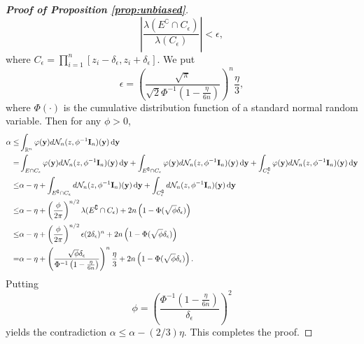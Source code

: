 \documentclass[11pt]{article}
\newcommand{\By}{\mathbf{y}}    \newcommand{\Bz}{\mathbf{z}}
\theoremstyle{plain}
\theoremstyle{definition}
\theoremstyle{remark}
\begin{document}
\begin{appendices}
\begin{proof}[\textbf{Proof of Proposition \ref{prop:unbiased}}]
    \begin{equation*}
        \left|\frac{\lambda(E^\complement\cap C_{\epsilon})}{\lambda(C_{\epsilon})}\right|<\epsilon,
    \end{equation*}
    where $C_{\epsilon}=\prod_{i=1}^n [z_i-\delta_{\epsilon}, z_i + \delta_{\epsilon}]$.
    We put
    \begin{equation*}
        \epsilon=\left(\frac{\sqrt \pi}{\sqrt 2 \Phi^{-1}\left(1-\frac{\eta}{6n}\right)}\right)^n \frac{\eta}{3},
    \end{equation*}
    where $\Phi(\cdot)$ is the cumulative distribution function of a standard normal random variable.
    Then for any $\phi>0$,
    \begin{equation*}
        \begin{split}
            \alpha \leq& 
            \int_{\mathbb R^n}\varphi(\By) d\mathcal N_n (z, \phi^{-1} \BI_n) (\By)\,\mathrm{d} \By
            \\
            =&
            \int_{E\cap C_{\epsilon}}\varphi(\By) d\mathcal N_n (z, \phi^{-1} \BI_n) (\By)\,\mathrm{d} \By
            +
            \int_{E^\complement\cap C_{\epsilon}}\varphi(\By) d\mathcal N_n (z, \phi^{-1} \BI_n) (\By)\,\mathrm{d} \By
            +
            \int_{C_{\epsilon}^\complement}\varphi(\By) d\mathcal N_n (z, \phi^{-1} \BI_n) (\By)\,\mathrm{d} \By
            \\
            \leq&
            \alpha-\eta
            +
            \int_{E^\complement\cap C_{\epsilon}} d\mathcal N_n (z, \phi^{-1} \BI_n) (\By)\,\mathrm{d} \By
            +
            \int_{C_{\epsilon}^\complement} d\mathcal N_n (z, \phi^{-1} \BI_n) (\By)\,\mathrm{d} \By
            \\
            \leq&
            \alpha-\eta
            +
            \left(\frac{\phi}{2\pi}\right)^{n/2}\lambda(E^\complement\cap C_{\epsilon})
            +
            2n\left(1-\Phi(\sqrt \phi \delta_\epsilon)\right)
            \\
            \leq&
            \alpha-\eta
            +
            \left(\frac{\phi}{2\pi}\right)^{n/2}
            \epsilon
            (2\delta_\epsilon)^n
            +
            2n\left(1-\Phi(\sqrt \phi \delta_\epsilon)\right)
            \\
            =&
            \alpha-\eta
            +
            \left(\frac{\sqrt{\phi} \delta_{\epsilon}}{\Phi^{-1}\left(1-\frac{\eta}{6n}\right)}\right)^{n}
            \frac{\eta}{3}
            +
            2n\left(1-\Phi(\sqrt \phi \delta_\epsilon)\right).
        \end{split}
    \end{equation*}
    Putting 
    \begin{equation*}
        \phi = \left(\frac{\Phi^{-1}\left(1-\frac{\eta}{6n}\right)}{\delta_\epsilon}\right)^2
    \end{equation*}
    yields the contradiction $\alpha\leq \alpha-(2/3)\eta$.
    This completes the proof.


\end{proof}
\end{appendices}
\end{document}
